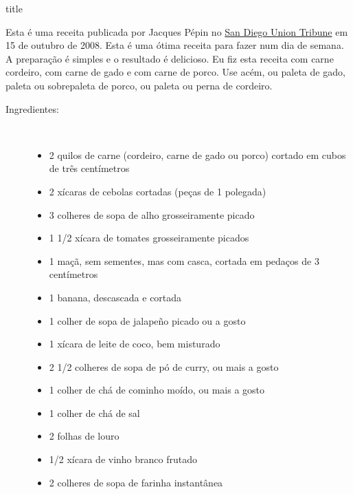 \documentclass [11pt, letterpaper] {article}
\begin{document}
 {title}

Esta é uma receita publicada por Jacques P\'epin no
\href {http://legacy.sandiegouniontribune.com/uniontrib/20081015/news_1f15pepin.html} {San Diego Union Tribune} em 15 de outubro de 2008. Esta é uma ótima receita para fazer num dia de semana. A preparação é simples e o resultado é delicioso. Eu fiz esta receita com carne cordeiro, com carne de gado e com carne de porco. Use ac\'em, ou paleta de gado, paleta ou sobrepaleta de porco, ou paleta ou perna de cordeiro.

\begin {description}

\item [Ingredientes:] \ \\
\begin {itemize}
\item 2 quilos de carne (cordeiro, carne de gado ou porco) cortado em cubos de tr\^es cent\'imetros
\item 2 xícaras de cebolas cortadas (peças de 1 polegada)
\item 3 colheres de sopa de alho grosseiramente picado
\item 1  1/2 xícara de tomates grosseiramente picados
\item 1 maçã, sem sementes, mas com casca, cortada em pedaços de 3 cent\'imetros
\item 1 banana, descascada e cortada
\item 1 colher de sopa de jalapeño picado ou a gosto
\item 1 xícara de leite de coco, bem misturado
\item 2 1/2 colheres de sopa de pó de curry, ou mais a gosto
\item 1 colher de chá de cominho moído, ou mais a gosto
\item 1 colher de chá de sal
\item 2 folhas de louro
\item 1/2 xícara de vinho branco frutado
\item 2 colheres de sopa de farinha instantânea
\end {itemize}


\end{description}
\end{document}

